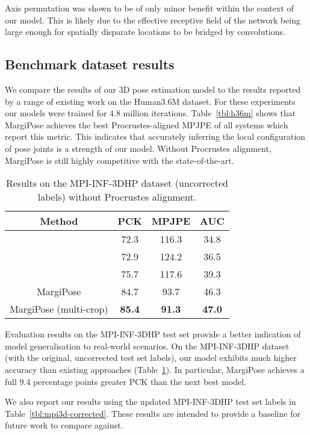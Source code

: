 \documentclass[australian,10pt,twocolumn,letterpaper,twocolumn]{article}
\providecommand{\tabularnewline}{\\}
\newcommand{\ourmodel}{MargiPose}
\begin{document}
Axis permutation was shown to be of only minor benefit within the
context of our model. This is likely due to the effective receptive
field of the network being large enough for spatially disparate locations
to be bridged by convolutions.

\subsection{Benchmark dataset results}

We compare the results of our 3D pose estimation model to the results
reported by a range of existing work on the Human3.6M dataset. For
these experiments our models were trained for 4.8 million iterations.
Table~\ref{tbl:h36m} shows that \ourmodel{} achieves the best Procrustes-aligned
MPJPE of all systems which report this metric. This indicates that
accurately inferring the local configuration of pose joints is a strength
of our model. Without Procrustes alignment, \ourmodel{} is still
highly competitive with the state-of-the-art.

\begin{table}
\begin{centering}
\begin{tabular}{cccc}
\hline 
Method & PCK & MPJPE & AUC\tabularnewline
\hline 
\citet{dabral2017structure} & 72.3 & 116.3 & 34.8\tabularnewline
\citet{kanazawa2017end} & 72.9 & 124.2 & 36.5\tabularnewline
\citet{mehta2017vnect} & 75.7 & 117.6 & 39.3\tabularnewline
\hline 
\ourmodel{} & 84.7 & 93.7 & 46.3\tabularnewline
\ourmodel{} (multi-crop) & \textbf{85.4} & \textbf{91.3} & \textbf{47.0}\tabularnewline
\hline 
\end{tabular}
\par\end{centering}
\caption{\label{tbl:mpi3d}Results on the MPI-INF-3DHP dataset (uncorrected
labels) without Procrustes alignment.}

\end{table}
Evaluation results on the MPI-INF-3DHP test set provide a better indication
of model generalisation to real-world scenarios. On the MPI-INF-3DHP
dataset (with the original, uncorrected test set labels), our model
exhibits much higher accuracy than existing approaches (Table~\ref{tbl:mpi3d}).
In particular, \ourmodel{} achieves a full 9.4 percentage points
greater PCK than the next best model.

We also report our results using the updated MPI-INF-3DHP test set
labels in Table~\ref{tbl:mpi3d-corrected}. These results are intended
to provide a baseline for future work to compare against.
\end{document}
